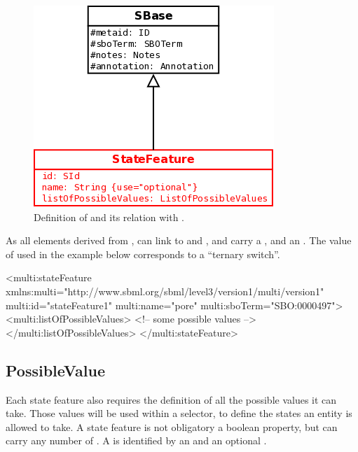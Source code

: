 \begin{figure}[H]
\begin{center}
\includegraphics[scale=0.3]{figs/pngs/StateFeatureClass.png} 
\caption{Definition of  and its relation with .}
\label{fig:StateFeatureClass}
\end{center}
\end{figure}

As all elements derived from ,  can link to  and , and carry a , and an . The value  of  used in the example below corresponds to a ``ternary switch''.

\begin{example}
<multi:stateFeature 
              xmlns:multi="http://www.sbml.org/sbml/level3/version1/multi/version1" 
              multi:id="stateFeature1"
              multi:name="pore"
              multi:sboTerm="SBO:0000497">
  <multi:listOfPossibleValues>
    <!-- some possible values -->
  </multi:listOfPossibleValues>
</multi:stateFeature>
\end{example}

\subsection{PossibleValue}

Each state feature also requires the definition of all the possible values it can take. Those values will be used within a selector, to define the states an entity is allowed to take. A state feature is not obligatory a boolean property, but can carry any number of . A  is identified by an  and an optional .

